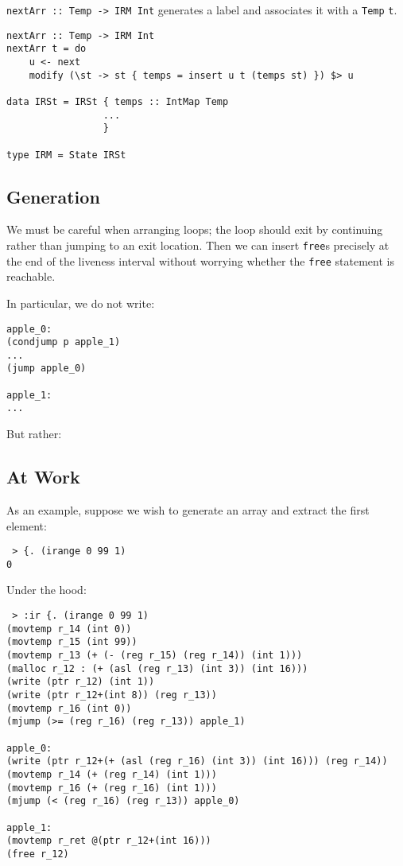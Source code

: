 \documentclass[sigplan,screen]{acmart}
\begin{document}
{\tt nextArr :: Temp -> IRM Int} generates a label and associates it with a {\tt Temp} {\tt t}.

\begin{verbatim}
nextArr :: Temp -> IRM Int
nextArr t = do
    u <- next
    modify (\st -> st { temps = insert u t (temps st) }) $> u

data IRSt = IRSt { temps :: IntMap Temp
                 ...
                 }

type IRM = State IRSt
\end{verbatim}

\subsection{Generation}

We must be careful when arranging loops; the loop should exit by continuing rather than jumping to an exit location. Then we can insert {\tt free}s precisely at the end of the liveness interval without worrying whether the {\tt free} statement is reachable.

In particular, we do not write:

\begin{verbatim}
apple_0:
(condjump p apple_1)
...
(jump apple_0)

apple_1:
...
\end{verbatim}

But rather:

\subsection{At Work}

As an example, suppose we wish to generate an array and extract the first element:

\begin{verbatim}
 > {. (irange 0 99 1)
0
\end{verbatim}

Under the hood:

\begin{verbatim}
 > :ir {. (irange 0 99 1)
(movtemp r_14 (int 0))
(movtemp r_15 (int 99))
(movtemp r_13 (+ (- (reg r_15) (reg r_14)) (int 1)))
(malloc r_12 : (+ (asl (reg r_13) (int 3)) (int 16)))
(write (ptr r_12) (int 1))
(write (ptr r_12+(int 8)) (reg r_13))
(movtemp r_16 (int 0))
(mjump (>= (reg r_16) (reg r_13)) apple_1)

apple_0:
(write (ptr r_12+(+ (asl (reg r_16) (int 3)) (int 16))) (reg r_14))
(movtemp r_14 (+ (reg r_14) (int 1)))
(movtemp r_16 (+ (reg r_16) (int 1)))
(mjump (< (reg r_16) (reg r_13)) apple_0)

apple_1:
(movtemp r_ret @(ptr r_12+(int 16)))
(free r_12)
\end{verbatim}
\end{document}
